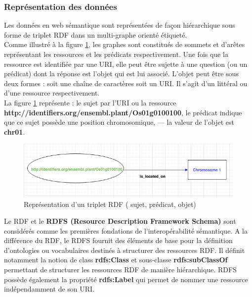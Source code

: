 \subsubsection*{Représentation des données}

Les données en web sémantique sont représentées de façon hiérarchique sous forme de triplet RDF dans un multi-graphe orienté étiqueté.\\

Comme illustré à la figure  \ref{triplet}, les graphes sont constitués de sommets et d’arêtes représentant les ressources et les prédicats respectivement. Une fois que la ressource est identifiée par une URI, elle peut être sujette à une question (ou un prédicat) dont la réponse est l’objet qui est lui associé. L’objet peut être sous deux formes : soit une chaîne de caractères soit un URI. Il s’agit d’un littéral ou d’une ressource respectivement.\\

La figure \ref{triplet} représente :
le sujet par l’URI ou la ressource \\ 
\textbf{http://identifiers.org/ensembl.plant/Os01g0100100},
le prédicat indique que ce sujet possède une position chromosomique, — la valeur de l’objet est \textbf{chr01}.

\begin{figure}[!ht]
\begin{center}
	\includegraphics[width=1\textwidth]{Figures/rdf-example.png}
\end{center}
\caption{\label{triplet} Représentation d'un triplet RDF ( {\color{green}sujet}, prédicat, {\color{blue}objet})}
\end{figure}


Le RDF et le \textbf{RDFS (Resource Description Framework Schema)} sont considérés comme les premières fondations de l’interopérabilité sémantique. A la différence du RDF, le RDFS fournit des éléments de base pour la définition d'ontologies ou vocabulaires destinés à structurer des ressources RDF. Il définit notamment la notion de class \textbf{rdfs:Class} et sous-classe \textbf{rdfs:subClassOf} permettant de structurer les ressources RDF de manière hiérarchique. RDFS possède également la propriété \textbf{rdfs:Label} qui permet de nommer une ressource indépendamment de son URI.\\

